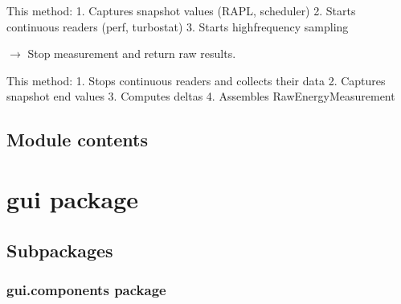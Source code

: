 \documentclass[letterpaper,10pt,english]{sphinxmanual}
\begin{document}
\begin{fulllineitems}
\begin{fulllineitems}
\sphinxAtStartPar
This method:
1. Captures snapshot values (RAPL, scheduler)
2. Starts continuous readers (perf, turbostat)
3. Starts high\sphinxhyphen{}frequency sampling

\end{fulllineitems}


\begin{fulllineitems}
\label{\detokenize{core.energy_engine:core.energy_engine.EnergyEngine.stop_measurement}}
\pysigstartsignatures
\pysiglinewithargsret
{}
{}
{{ $\rightarrow$ {\hyperref[\detokenize{core.models.raw_energy_measurement:core.models.raw_energy_measurement.RawEnergyMeasurement}]{}}}}
\pysigstopsignatures
\sphinxAtStartPar
Stop measurement and return raw results.

\sphinxAtStartPar
This method:
1. Stops continuous readers and collects their data
2. Captures snapshot end values
3. Computes deltas
4. Assembles RawEnergyMeasurement

\end{fulllineitems}


\end{fulllineitems}



\section{Module contents}
\label{\detokenize{core:module-core}}\label{\detokenize{core:module-contents}}
\sphinxstepscope


\chapter{gui package}
\label{\detokenize{gui:gui-package}}\label{\detokenize{gui::doc}}

\section{Subpackages}
\label{\detokenize{gui:subpackages}}
\sphinxstepscope


\subsection{gui.components package}
\label{\detokenize{gui.components:gui-components-package}}\label{\detokenize{gui.components::doc}}
\end{document}
